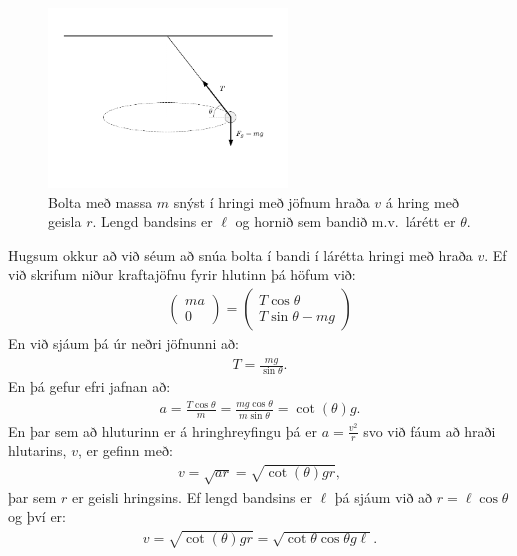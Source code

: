 \begin{minipage}{\linewidth}
\begin{figure}
\vspace{-1cm}
\centering
\includegraphics[width=2.5in]{temp/togberthringbert.pdf}
\caption{Bolta með massa $m$ snýst í hringi með jöfnum hraða $v$ á hring með geisla $r$. Lengd bandsins er $\ell$ og hornið sem bandið m.v.~lárétt er $\theta$.}
\label{fig:togkraftshringhreyf}
\end{figure}

Hugsum okkur að við séum að snúa bolta í bandi í lárétta hringi með hraða $v$. Ef við skrifum niður kraftajöfnu fyrir hlutinn þá höfum við:
\begin{align*}
    \begin{pmatrix} ma \\ 0 \end{pmatrix} = \begin{pmatrix} T\cos\theta \\ T\sin\theta - mg \end{pmatrix}
\end{align*}
En við sjáum þá úr neðri jöfnunni að:
\begin{align*}
    T = \frac{mg}{\sin\theta}.
\end{align*}
En þá gefur efri jafnan að:
\begin{align*}
    a = \frac{T\cos\theta}{m} = \frac{mg \cos\theta}{m \sin\theta} = \cot(\theta) g.
\end{align*}
En þar sem að hluturinn er á hringhreyfingu þá er $a = \frac{v^2}{r}$ svo við fáum að hraði hlutarins, $v$, er gefinn með:
\begin{align*}
    v = \sqrt{ar} = \sqrt{\cot(\theta) gr},
\end{align*}
þar sem $r$ er geisli hringsins. Ef lengd bandsins er $\ell$ þá sjáum við að $r = \ell \cos\theta$ og því er:
\begin{align*}
    v = \sqrt{\cot(\theta) gr} = \sqrt{\cot\theta \cos\theta g \ell}.
\end{align*}

\end{minipage}

